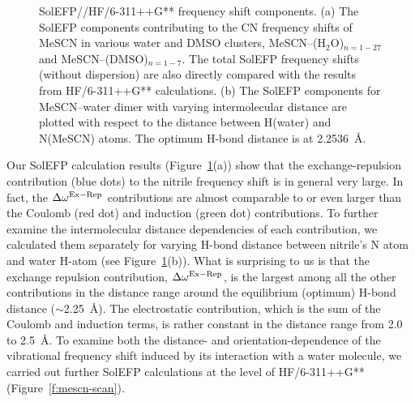 \documentclass[a4paper,titlepage,twoside,fleqn,12pt]{book}
\begin{document}
\begin{refsection}
%
\begin{figure}[t!]
\centering
\setlength\fboxsep{0.4pt}
\setlength\fboxrule{0.5pt}
\caption{
SolEFP//HF/6-311++G** frequency shift components. (a) The SolEFP components contributing to the CN
frequency shifts of MeSCN in various water and DMSO clusters, MeSCN--(H$_2$O)$_{n=1-27}$ 
and MeSCN--(DMSO)$_{n=1-7}$.
The total SolEFP frequency shifts (without dispersion) 
are also directly compared with the results from HF/6-311++G**
calculations. (b) The SolEFP components for MeSCN--water dimer with varying intermolecular distance are
plotted with respect to the distance between H(water) and N(MeSCN) atoms. The optimum H-bond distance
is at 2.2536~\AA.
\label{f:mescn-solefp-qm}}
\end{figure}
%
Our SolEFP calculation results (Figure~\ref{f:mescn-solefp-qm}(a)) show that the
exchange\hyp{}repulsion contribution (blue dots) to the nitrile
frequency shift is in general very large. In fact, the $\Delta\omega^{\rm Ex-Rep}$
contributions are almost comparable to or even larger than
the Coulomb (red dot) and induction (green dot) contributions.
To further examine the intermolecular distance dependencies
of each contribution, we calculated them separately for
varying H-bond distance between nitrile's N atom and water
H-atom (see Figure~\ref{f:mescn-solefp-qm}(b)). What is surprising to us is that the
exchange repulsion contribution, $\Delta\omega^{\rm Ex-Rep}$, is the largest among
all the other contributions in the distance range around the
equilibrium (optimum) H-bond distance ($\sim$2.25~\AA). The
electrostatic contribution, which is the sum of the Coulomb
and induction terms, is rather constant in the distance range
from 2.0 to 2.5~\AA. To examine both the distance- and
orientation\hyp{}dependence of the vibrational frequency shift
induced by its interaction with a water molecule, we carried
out further SolEFP calculations at the level of HF/6-311++G**
(Figure~\ref{f:mescn-scan}). 
%
\begin{figure}[t!]

\end{figure}
\end{refsection}
\end{document}
